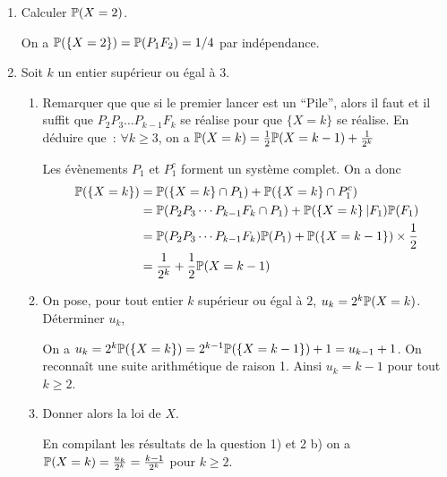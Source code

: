 \documentclass[a4paper]{tp_um}
\begin{document}
\begin{enumerate}

\item  Calculer $\P(X=2)$.
	
\bigskip



	On a $\P(\left\{ X=2 \right\}) = \P(P_1 F_2) = 1/4$ par indépendance. 

\bigskip



\item  Soit $k$ un entier sup\'erieur ou \'egal \`a $3$.

 \begin{enumerate}
\item Remarquer que  que si le premier lancer est un ``Pile'', alors il faut et il suffit que $P_2 P_3 \dots P_{k-1}F_k$ se
	r\'ealise pour que $\{X=k\}$ se r\'ealise.  En d\'eduire que~: $\forall k\ge 3$, on a $\P(X=k)={1\over 2} \P(X=k-1)+{1\over
2^k}$

\bigskip




Les évènements $P_1$ et $P_1^c$ forment un système complet. On a donc
\begin{align*}
	\P( \left\{ X=k \right\}) & = 	\P( \left\{ X=k\right\} \cap P_1 ) + 	\P( \left\{ X=k \right\} \cap P_1^c) \\
	& = \P( P_2 P_3 \cdots P_{k-1}F_k \cap P_1) + \P( \left\{ X=k \right\} | F_1) \P(F_1) \\
	& = \P( P_2 P_3 \cdots P_{k-1}F_k) \P(P_1) + \P(\left\{ X = k-1 \right\}) \times \frac 1 2 \\
	& = {1\over 2^k} + {1\over 2} \P(X=k-1)
\end{align*}



\item On pose, pour tout entier $k$ sup\'erieur ou \'egal \`a $2$, $u_k= 2^k\P(X = k)$. D\'eterminer $u_k$,
	
\bigskip




On a	$ u_k = 2^k  \P( \left\{ X=k \right\}) =  2^{k-1} \P(\left\{ X = k-1 \right\})+1 = u_{k-1} +1$. On reconnaît une suite arithmétique de raison 1. Ainsi $u_k = k-1$ pour tout $k\geq 2$.

\bigskip




\item Donner alors la loi de $X$.

	\bigskip
En compilant les résultats de la question 1) et 2 b) on a  $\P(X=k)= \frac{u_k}{2^k} = \frac{k-1}{2^k} $ pour $k\geq 2$.
\bigskip


\end{enumerate}
\end{enumerate}
\end{document}
